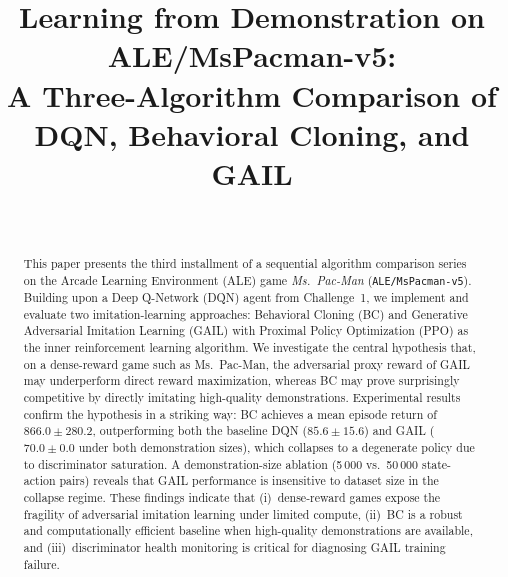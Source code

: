 \documentclass[conference]{IEEEtran}
\begin{document}
\title{Learning from Demonstration on ALE/MsPacman-v5:\\
A Three-Algorithm Comparison of DQN, Behavioral Cloning, and GAIL}

\author{
  \and
  \and
  \\[6pt]
}

\maketitle

\begin{abstract}
This paper presents the third installment of a sequential algorithm comparison series on
the Arcade Learning Environment (ALE) game \textit{Ms.\ Pac-Man} (\texttt{ALE/MsPacman-v5}).
Building upon a Deep Q-Network (DQN) agent from Challenge~1, we implement and evaluate
two imitation-learning approaches: Behavioral Cloning (BC) and Generative Adversarial
Imitation Learning (GAIL) with Proximal Policy Optimization (PPO) as the inner
reinforcement learning algorithm.
We investigate the central hypothesis that, on a dense-reward game such as Ms.\ Pac-Man,
the adversarial proxy reward of GAIL may underperform direct reward maximization, whereas
BC may prove surprisingly competitive by directly imitating high-quality demonstrations.
Experimental results confirm the hypothesis in a striking way: BC achieves a mean episode
return of $866.0 \pm 280.2$, outperforming both the baseline DQN ($85.6 \pm 15.6$) and
GAIL ($70.0 \pm 0.0$ under both demonstration sizes), which collapses to a degenerate
policy due to discriminator saturation.
A demonstration-size ablation (5\,000 vs.\ 50\,000 state-action pairs) reveals that GAIL
performance is insensitive to dataset size in the collapse regime.
These findings indicate that (i)~dense-reward games expose the fragility of adversarial
imitation learning under limited compute, (ii)~BC is a robust and computationally efficient
baseline when high-quality demonstrations are available, and (iii)~discriminator health
monitoring is critical for diagnosing GAIL training failure.
\end{abstract}
\end{document}
